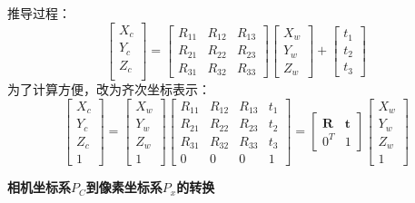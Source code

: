 \documentclass[10pt]{article}
\begin{document}
推导过程：
$$
\left[\begin{array}{l} X_c \\ Y_c \\ Z_c \\ \end{array}\right]
=
\left[\begin{array}{lll} R_{11} & R_{12} & R_{13} \\ R_{21} & R_{22} & R_{23} \\R_{31} & R_{32} & R_{33} \end{array}\right]
\left[\begin{array}{l} X_w \\ Y_w \\ Z_w \end{array}\right]
+ 
\left[ \begin{array}{l} t_1 \\ t_2 \\t_3 \end{array} \right]
$$ 
为了计算方便，改为齐次坐标表示：
$$ 
\left[\begin{array}{l} X_c \\ Y_c \\ Z_c \\ 1 \end{array}\right]
=
\left[\begin{array}{l} X_w \\ Y_w \\ Z_w \\ 1 \end{array}\right]
\left[\begin{array}{llll} R_{11} & R_{12} & R_{13} & t_1 \\ R_{21} & R_{22} & R_{23} & t_2 \\ R_{31} & R_{32} & R_{33} & t_3  \\ 0 & 0 & 0 & 1 \end{array}\right]
=
\left[\begin{array}{ll} \textbf{R} & \textbf{t} \\ 0^T & 1 \end{array} \right]
\left[\begin{array}{l} X_w \\ Y_w \\ Z_w \\ 1 \end{array}\right]
$$

\textbf{相机坐标系$P_C$到像素坐标系$P_x$的转换} 
\end{document}
